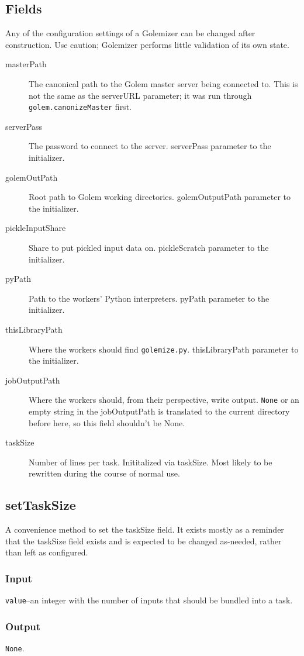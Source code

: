 \documentclass[11pt,ebook,oneside,final]{memoir} %
\begin{document}
\subsection{Fields}
Any of the configuration settings of a Golemizer can be changed after construction. Use caution; Golemizer performs little validation of its own state.
\begin{description}
	\item[masterPath] The canonical path to the Golem master server being connected to. This is not the same as the serverURL parameter; it was run through \texttt{golem.canonizeMaster} first.
	\item[serverPass] The password to connect to the server. serverPass parameter to the initializer.
	\item[golemOutPath] Root path to Golem working directories. golemOutputPath parameter to the initializer.
	\item[pickleInputShare] Share to put pickled input data on. pickleScratch parameter to the initializer.
	\item[pyPath] Path to the workers' Python interpreters. pyPath parameter to the initializer.
	\item[thisLibraryPath] Where the workers should find \texttt{golemize.py}. thisLibraryPath parameter to the initializer.
	\item[jobOutputPath] Where the workers should, from their perspective, write output. \texttt{None} or an empty string in the jobOutputPath is translated to the current directory before here, so this field shouldn't be None.
	\item[taskSize] Number of lines per task. Inititalized via taskSize. Most likely to be rewritten during the course of normal use.
\end{description}

\subsection{setTaskSize}
A convenience method to set the taskSize field. It exists mostly as a reminder that the taskSize field exists and is expected to be changed as-needed, rather than left as configured.
\subsubsection*{Input}
\texttt{value}--an integer with the number of inputs that should be bundled into a task.
\subsubsection*{Output}
\texttt{None}.
\end{document}
